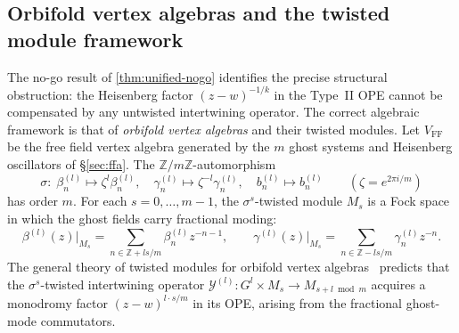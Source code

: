 \documentclass[12pt]{article}
\theoremstyle{plain}
\theoremstyle{definition}
\theoremstyle{remark}
\newcommand{\Z}{\mathbb{Z}}
\newcommand{\bl}[1]{\beta^{(#1)}}
\newcommand{\gl}[1]{\gamma^{(#1)}}
\begin{document}
\subsection{Orbifold vertex algebras and the twisted module framework}
The no-go result of \cref{thm:unified-nogo} identifies the precise structural
obstruction: the Heisenberg factor $(z-w)^{-1/k}$ in the Type~II OPE cannot be
compensated by any untwisted intertwining operator.
The correct algebraic framework is that of \emph{orbifold vertex algebras}
and their twisted modules.
Let $V_\mathrm{FF}$ be the free field vertex algebra generated by the
$m$ ghost systems and Heisenberg oscillators of \S\ref{sec:ffa}.
The $\Z/m\Z$-automorphism
\[
  \sigma:\;\bl{l}_n\mapsto \zeta^l\bl{l}_n,\quad
  \gl{l}_n\mapsto\zeta^{-l}\gl{l}_n,\quad
  b^{(l)}_n\mapsto b^{(l)}_n \qquad(\zeta=e^{2\pi i/m})
\]
has order $m$.  For each $s=0,\ldots,m-1$, the $\sigma^s$-twisted module
$M_s$ is a Fock space in which the ghost fields carry fractional moding:
\[
  \bl{l}(z)\big|_{M_s} = \sum_{n\in\Z+ls/m}\bl{l}_n z^{-n-1},\qquad
  \gl{l}(z)\big|_{M_s} = \sum_{n\in\Z-ls/m}\gl{l}_n z^{-n}.
\]
The general theory of twisted modules for orbifold vertex algebras~\cite{Kac}
predicts that the $\sigma^s$-twisted intertwining operator
$\mathcal{Y}^{(l)}: G^l \times M_s \to M_{s+l\bmod m}$
acquires a monodromy factor $(z-w)^{l\cdot s/m}$ in its OPE,
arising from the fractional ghost-mode commutators.
\end{document}
